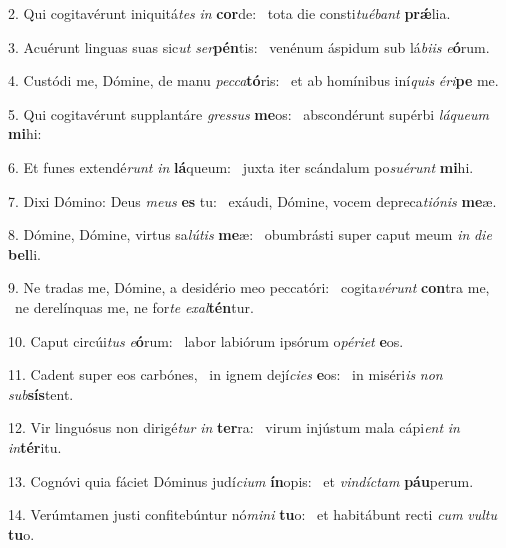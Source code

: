 2. Qui cogitavérunt iniquitá\textit{tes} \textit{in} \textbf{cor}de: \ast\  tota die consti\textit{tu}\textit{é}\textit{bant} \textbf{prǽ}lia.\

3. Acuérunt linguas suas sic\textit{ut} \textit{ser}\textbf{pén}tis: \ast\  venénum áspidum sub lá\textit{bi}\textit{is} \textit{e}\textbf{ó}rum.\

4. Custódi me, Dómine, de manu \textit{pec}\textit{ca}\textbf{tó}ris: \ast\  et ab homínibus iní\textit{quis} \textit{é}\textit{ri}\textbf{pe} me.\

5. Qui cogitavérunt supplantáre \textit{gres}\textit{sus} \textbf{me}os: \ast\  abscondérunt supérbi \textit{lá}\textit{que}\textit{um} \textbf{mi}hi:\

6. Et funes extendé\textit{runt} \textit{in} \textbf{lá}queum: \ast\  juxta iter scándalum po\textit{su}\textit{é}\textit{runt} \textbf{mi}hi.\

7. Dixi Dómino: Deus \textit{me}\textit{us} \textbf{es} tu: \ast\  exáudi, Dómine, vocem depreca\textit{ti}\textit{ó}\textit{nis} \textbf{me}æ.\

8. Dómine, Dómine, virtus sa\textit{lú}\textit{tis} \textbf{me}æ: \ast\  obumbrásti super caput meum \textit{in} \textit{di}\textit{e} \textbf{bel}li.\

9. Ne tradas me, Dómine, a desidério meo peccatóri: \dag\  cogita\textit{vé}\textit{runt} \textbf{con}tra me, \ast\  ne derelínquas me, ne for\textit{te} \textit{ex}\textit{al}\textbf{tén}tur.\

10. Caput circúi\textit{tus} \textit{e}\textbf{ó}rum: \ast\  labor labiórum ipsórum o\textit{pé}\textit{ri}\textit{et} \textbf{e}os.\

11. Cadent super eos carbónes, \dag\  in ignem dejí\textit{ci}\textit{es} \textbf{e}os: \ast\  in miséri\textit{is} \textit{non} \textit{sub}\textbf{sís}tent.\

12. Vir linguósus non dirigé\textit{tur} \textit{in} \textbf{ter}ra: \ast\  virum injústum mala cápi\textit{ent} \textit{in} \textit{in}\textbf{tér}itu.\

13. Cognóvi quia fáciet Dóminus judí\textit{ci}\textit{um} \textbf{ín}opis: \ast\  et \textit{vin}\textit{díc}\textit{tam} \textbf{páu}perum.\

14. Verúmtamen justi confitebúntur nó\textit{mi}\textit{ni} \textbf{tu}o: \ast\  et habitábunt recti \textit{cum} \textit{vul}\textit{tu} \textbf{tu}o.\

